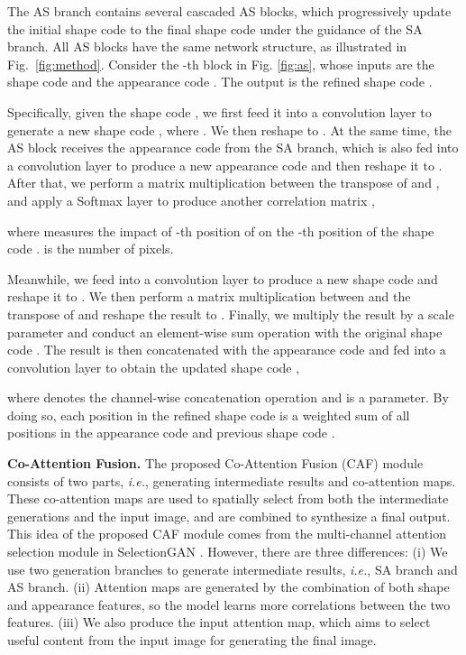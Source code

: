 \documentclass[runningheads]{llncs}
\begin{document}
The AS branch contains several cascaded AS blocks, which progressively update the initial shape code  to the final shape code  under the guidance of the SA branch. 
All AS blocks have the same network structure, as illustrated in Fig.~\ref{fig:method}.
Consider the -th block in Fig. \ref{fig:as}, whose inputs are the shape code  and the appearance code . The output is the refined shape code .

Specifically, given the shape code , we first feed it into a convolution layer to generate a new shape code , where . 
We then reshape  to .
At the same time, the AS block receives the appearance code  from the SA branch, which is also fed into a convolution layer to produce a new appearance code  and then reshape it to .
After that, we perform a matrix multiplication between the transpose of  and , and apply a Softmax layer to produce another correlation matrix ,

where  measures the impact of -th position of  on the -th position of the shape code .  is the number of pixels.

Meanwhile, we feed  into a convolution layer to produce a new shape code  and reshape it to .
We then perform a matrix multiplication between  and the transpose of  and reshape the result to .
Finally, we multiply the result by a scale parameter  and conduct an element-wise sum operation with the original shape code .
The result is then concatenated with the appearance code  and fed into a convolution layer to obtain the updated shape code ,

where  denotes the channel-wise concatenation operation and  is a parameter.
By doing so, each position in the refined shape code  is a weighted sum of all positions in the appearance code  and previous shape code .

\noindent \textbf{Co-Attention Fusion.}
The proposed Co-Attention Fusion (CAF) module consists of two parts, \emph{i.e.}, generating intermediate results and co-attention maps.
These co-attention maps are used to spatially select from both the intermediate generations and the input image, and are combined to synthesize a final output.
This idea of the proposed CAF module comes from the multi-channel attention selection module in SelectionGAN \cite{tang2019multi}.
However, there are three differences: (i) We use two generation branches to generate intermediate results, \emph{i.e.}, SA branch and AS branch.
(ii) Attention maps are generated by the combination of both shape and appearance features, so the model learns more correlations between the two features.
(iii) We also produce the input attention map, which aims to select useful content from the input image for generating the final image.
\end{document}
